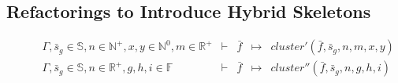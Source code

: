 \documentclass[final]{jfp1}
\newcommand{\f}[0]{\bar{f}}
\newcommand{\s}[0]{\bar{s}}
\newcommand{\blf}[0]{\mathbb{F}}
\newcommand{\bs}[0]{\mathbb{S}}
\newcommand{\bn}[0]{\mathbb{N}}
\newcommand{\br}[0]{\mathbb{R}}
\newcommand{\bnp}[0]{\bn^{+}}
\newcommand{\bnz}[0]{\bn^{0}}
\newcommand{\brp}[0]{\br^{+}}
\newcommand{\rewrite}[3]{#1 & \vdash{} & #2 & \mapsto{} & #3}
\begin{document}
\subsection{Refactorings to Introduce Hybrid Skeletons}
\label{sec:hybridRefactorings}

\iffalse
\begin{figure}[t]
\[
  \begin{array}{lrclcl} %
    \rewrite{\Gamma, \s_g \in \bs, n \in \bnp, x,y \in \bnz, m \in
    \brp}{\f}{cluster'(\f, \s_g, n, m, x, y)} \\
    \rewrite{\Gamma, \s_g \in \bs, n \in \brp, g,h,i \in \blf}{\f}{cluster''(\f,
    \s_g, n, g, h, i)}
  \end{array}
\]


\end{figure}
\end{document}
